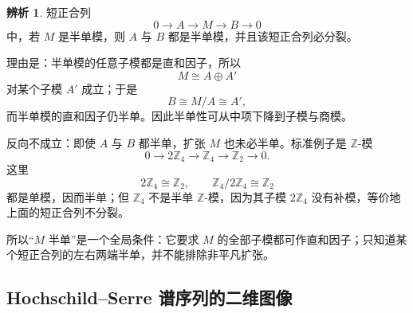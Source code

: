 \documentclass[a4paper]{ctexart}
\theoremstyle{definition}
\theoremstyle{analysis}
\newtheorem{remark}{辨析}[section]
\theoremstyle{plain}
\begin{document}
\begin{remark}
\label{rem:semisimple-short-exact-sequence}
短正合列
\[
  0\longrightarrow A\longrightarrow M\longrightarrow B\longrightarrow 0
\]
中，若 \(M\) 是半单模，则 \(A\) 与 \(B\) 都是半单模，并且该短正合列必分裂。

理由是：半单模的任意子模都是直和因子，所以
\[
  M\cong A\oplus A'
\]
对某个子模 \(A'\) 成立；于是
\[
  B\cong M/A\cong A',
\]
而半单模的直和因子仍半单。因此半单性可从中项下降到子模与商模。

反向不成立：即使 \(A\) 与 \(B\) 都半单，扩张 \(M\) 也未必半单。标准例子是 \(\mathbb Z\)-模
\[
  0\longrightarrow 2\mathbb Z_4
  \longrightarrow \mathbb Z_4
  \longrightarrow \mathbb Z_2
  \longrightarrow 0.
\]
这里
\[
  2\mathbb Z_4\cong\mathbb Z_2,\qquad
  \mathbb Z_4/2\mathbb Z_4\cong\mathbb Z_2
\]
都是单模，因而半单；但 \(\mathbb Z_4\) 不是半单 \(\mathbb Z\)-模，因为其子模 \(2\mathbb Z_4\) 没有补模，等价地上面的短正合列不分裂。

所以“\(M\) 半单”是一个全局条件：它要求 \(M\) 的全部子模都可作直和因子；只知道某个短正合列的左右两端半单，并不能排除非平凡扩张。
\end{remark}

\subsection{Hochschild--Serre 谱序列的二维图像}\label{subsec:hs-spectral-sequence-plane}
\end{document}
